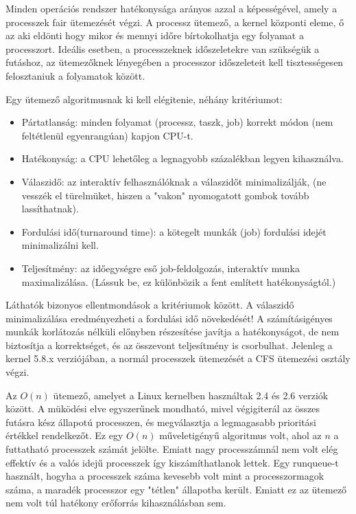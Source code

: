

Minden operációs rendszer hatékonysága arányos azzal a képességével, amely a processzek fair ütemezését végzi. A processz ütemező, a kernel központi eleme, ő az aki eldönti hogy mikor és mennyi időre bírtokolhatja egy folyamat a processzort. Ideális esetben, a processzeknek időszeletekre van szükségük a futáshoz, az ütemezőknek lényegében a processzor időszeleteit kell tisztességesen felosztaniuk a folyamatok között.

Egy ütemező algoritmusnak ki kell elégitenie, néhány kritériumot:
\begin{itemize}
	\item Pártatlanság: minden folyamat (processz, taszk, job) korrekt módon (nem feltétlenül egyenrangúan) kapjon CPU-t.
	\item Hatékonyság: a CPU lehetőleg a legnagyobb százalékban legyen kihasználva.
	\item Válaszidő: az interaktív felhasználóknak a válaszidőt minimalizálják, (ne vesszék el türelmüket, hiszen a "vakon" nyomogatott gombok tovább lassíthatnak).
	\item Fordulási idő(turnaround time): a kötegelt munkák (job) fordulási idejét minimalizálni
kell.
	\item Teljesítmény: az időegységre eső job-feldolgozás, interaktív munka maximalizálása.
(Lássuk be, ez különbözik a fent említett hatékonyságtól.)
\end{itemize}
Láthatók bizonyos ellentmondások a kritériumok között. A válaszidő minimalizálása eredményezheti a fordulási idő növekedését!
A számításigényes munkák korlátozás nélküli
előnyben részesítése javítja a hatékonyságot, de nem biztosítja a korrektséget, és az összevont
teljesítmény is csorbulhat.
Jelenleg a kernel 5.8.x verziójában, a normál processzek ütemezését a CFS ütemezési osztály végzi. 


Az $O(n)$ ütemező, amelyet a Linux kernelben használtak 2.4 és 2.6 verziók között. A müködési elve egyszerűnek mondható, mivel végigiterál az összes futásra kész állapotú processzen, és megválasztja a legmagasabb prioritási értékkel rendelkezőt.
Ez egy $O(n)$ műveletigényű algoritmus volt, ahol az $n$ a futtatható processzek számát jelölte. Emiatt nagy processzámnál nem volt elég effektív és a valós idejű processzek így kiszámíthatlanok lettek.
Egy runqueue-t használt, hogyha a processzek száma kevesebb volt mint a processzormagok száma, a maradék processzor egy "tétlen" állapotba került. Emiatt ez az ütemező nem volt túl hatékony erőforrás kihasználásban sem.

